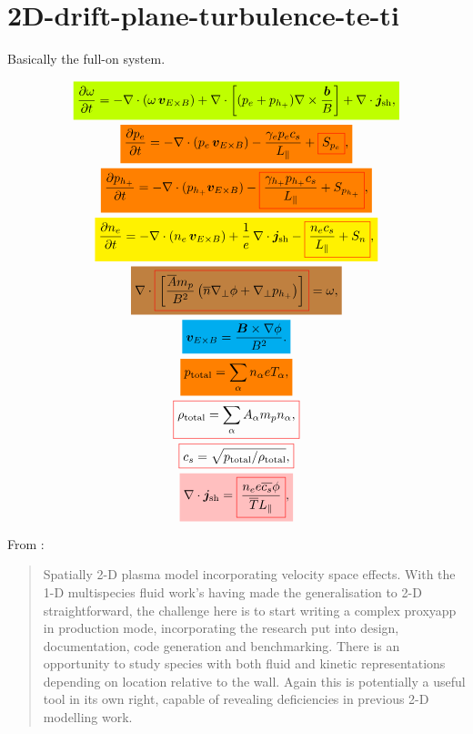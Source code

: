 \documentclass[12pt]{article}
\makeatletter
\newcommand{\mathcolorbox}[2]{\colorbox{#1}{$\displaystyle #2$}}
\newcommand*{\colorboxed}{}
\def\colorboxed#1#{\colorboxedAux{#1}}
\newcommand*{\colorboxedAux}[3]{
    \begingroup
        \colorlet{cb@saved}{.}
        \color#1{#2}
        \boxed{\color{cb@saved}#3}
    \endgroup
}
\makeatother
\begin{document}
\newpage

\section{2D-drift-plane-turbulence-te-ti}

Basically the full-on system.

\begin{gather}
    \mathcolorbox{lime}{ \frac{\partial\omega}{\partial t} = - \nabla \cdot (\omega \, \bm{v}_{E \times B}) + \nabla \cdot \left[ (p_e + p_{h_+}) \nabla \times \frac{\bm{b}}{B} \right] + \nabla \cdot \bm{j}_\text{sh} , } \\
    \mathcolorbox{orange}{ \frac{\partial p_e}{\partial t} = - \nabla \cdot (p_e \, \bm{v}_{E \times B}) - \frac{\gamma_e p_e c_s}{L_\parallel} + \colorboxed{red}{ S_{p_e} } , } \\
    \mathcolorbox{orange}{ \frac{\partial p_{h_+}}{\partial t} = - \nabla \cdot (p_{h_+} \bm{v}_{E \times B}) - \colorboxed{red}{ \frac{\gamma_{h_+} p_{h_+} c_s}{L_\parallel} + S_{p_{h_+}} } , } \\
    \mathcolorbox{yellow}{ \frac{\partial n_e}{\partial t} = - \nabla \cdot (n_e \, \bm{v}_{E \times B}) + \frac{1}{e} \, \nabla \cdot \bm{j}_\text{sh} - \colorboxed{red}{ \frac{n_e c_s}{L_\parallel} + S_n } , } \\
    \mathcolorbox{brown}{ \nabla \cdot \colorboxed{red}{ \left[ \frac{\overline{A} m_p}{B^2} \left( \overline{n} \nabla_\perp \phi + \nabla_\perp p_{h_+} \right) \right] } = \omega , } \\
    \mathcolorbox{cyan}{ \bm{v}_{E \times B} = \frac{\bm{B} \times \nabla \phi}{B^2} . } \\
    \mathcolorbox{orange}{ p_\text{total} = \sum_\alpha n_\alpha eT_\alpha , } \\
    \colorboxed{red}{ \rho_\text{total} = \sum_\alpha A_\alpha m_p n_\alpha , } \\
    \colorboxed{red}{ c_s = \sqrt{p_\text{total} / \rho_\text{total}} , } \\
    \mathcolorbox{pink}{ \nabla \cdot \bm{j}_\text{sh} = \colorboxed{red}{ \frac{n_e e \overline{c_s} \phi}{\overline{T} L_\parallel} } , }
\end{gather}

From \cite{Arter_Equations_2023}:
%
\begin{quote}
    Spatially 2-D plasma model incorporating velocity space effects. With the 1-D multispecies fluid work’s having made the generalisation to 2-D straightforward, the challenge here is to start writing a complex proxyapp in production mode, incorporating the research put into design, documentation, code generation and benchmarking. There is an opportunity to study species with both fluid and kinetic representations depending on location relative to the wall. Again this is potentially a useful tool in its own right, capable of revealing deficiencies in previous 2-D modelling work.
\end{quote}
\end{document}
